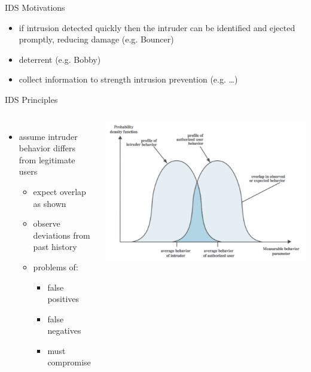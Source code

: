 \documentclass{beamer}
\begin{document}
\begin{frame}{IDS Motivations}
  \begin{itemize}
    \item if intrusion detected quickly then the intruder can be
      identified and ejected promptly, reducing damage
      (e.g. Bouncer)
    \item deterrent
      (e.g. Bobby)
    \item collect information to strength intrusion prevention
      (e.g. \dots)
  \end{itemize}
\end{frame}

\begin{frame}{IDS Principles}
  \begin{columns}[c]
  \begin{itemize}
  \item assume intruder behavior differs from legitimate 
    users 
    \begin{itemize}
    \item expect overlap as shown 
    \item observe deviations 
      from past history 
    \item problems of: 
      \begin{itemize}
      \item false positives 
      \item false negatives 
      \item must compromise 
      \end{itemize}
    \end{itemize}
  \end{itemize}
  \includegraphics[width=1\linewidth]{falsepositive}
  \end{columns}
\end{frame}
\end{document}

